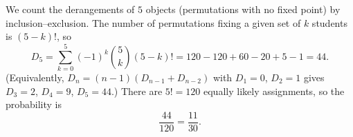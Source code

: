 We count the derangements of $5$ objects (permutations with no fixed point) by inclusion--exclusion. The number of permutations fixing a given set of $k$ students is $(5-k)!$, so
\[
D_5=\sum_{k=0}^{5}(-1)^k\binom5k(5-k)!=120-120+60-20+5-1=44 .
\]
(Equivalently, $D_n=(n-1)(D_{n-1}+D_{n-2})$ with $D_1=0$, $D_2=1$ gives $D_3=2$, $D_4=9$, $D_5=44$.) There are $5!=120$ equally likely assignments, so the probability is
\[
\dfrac{44}{120}=\boxed{\dfrac{11}{30}}.
\]
